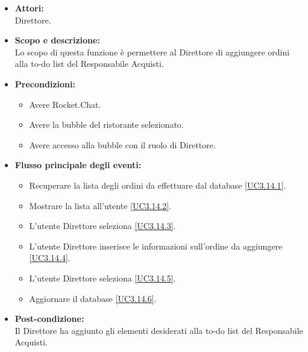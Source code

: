 \begin{itemize}
	\item \textbf{Attori:}
	\\Direttore.
	\item \textbf{Scopo e descrizione:} 
	\\Lo scopo di questa funzione è permettere al Direttore di aggiungere ordini alla to-do list del Responsabile Acquisti.
	\item \textbf{Precondizioni:}
	\begin{itemize}
		\item Avere Rocket.Chat.
		\item Avere la bubble del ristorante selezionato.
		\item Avere accesso alla bubble con il ruolo di Direttore.
	\end{itemize}
	\item \textbf{Flusso principale degli eventi:}
	\begin{itemize}
		\item Recuperare la lista degli ordini da effettuare dal database \ref{UC3.14.1}.
		\item Mostrare la lista all'utente \ref{UC3.14.2}.
		\item L'utente Direttore seleziona  \ref{UC3.14.3}.
		\item L'utente Direttore inserisce le informazioni sull'ordine da aggiungere \ref{UC3.14.4}.
		\item L'utente Direttore seleziona  \ref{UC3.14.5}.
		\item Aggiornare il database \ref{UC3.14.6}.
	\end{itemize}
	\item \textbf{Post-condizione:}
	\\Il Direttore ha aggiunto gli elementi desiderati alla to-do list del Responsabile Acquisti.
\end{itemize}


